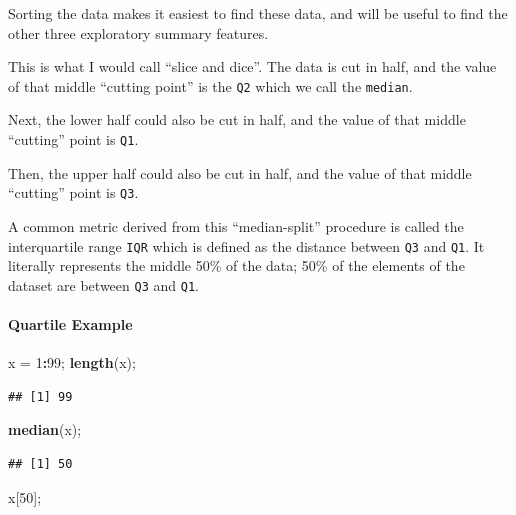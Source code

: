 \documentclass[
]{article}
\newenvironment{Shaded}{\begin{snugshade}}{\end{snugshade}}
\newcommand{\DecValTok}[1]{\textcolor[rgb]{0.00,0.00,0.81}{#1}}
\newcommand{\KeywordTok}[1]{\textcolor[rgb]{0.13,0.29,0.53}{\textbf{#1}}}
\newcommand{\NormalTok}[1]{#1}
\newcommand{\OperatorTok}[1]{\textcolor[rgb]{0.81,0.36,0.00}{\textbf{#1}}}
\newcommand{\StringTok}[1]{\textcolor[rgb]{0.31,0.60,0.02}{#1}}
\begin{document}
Sorting the data makes it easiest to find these data, and will be useful
to find the other three exploratory summary features.

This is what I would call ``slice and dice''. The data is cut in half,
and the value of that middle ``cutting point'' is the \texttt{Q2} which
we call the \texttt{median}.

Next, the lower half could also be cut in half, and the value of that
middle ``cutting'' point is \texttt{Q1}.

Then, the upper half could also be cut in half, and the value of that
middle ``cutting'' point is \texttt{Q3}.

A common metric derived from this ``median-split'' procedure is called
the interquartile range \texttt{IQR} which is defined as the distance
between \texttt{Q3} and \texttt{Q1}. It literally represents the middle
50\% of the data; 50\% of the elements of the dataset are between
\texttt{Q3} and \texttt{Q1}.

\hypertarget{quartile-example}{%
\paragraph{Quartile Example}\label{quartile-example}}

\begin{Shaded}
\begin{Highlighting}[]
\NormalTok{x =}\StringTok{ }\DecValTok{1}\OperatorTok{:}\DecValTok{99}\NormalTok{;}
\KeywordTok{length}\NormalTok{(x);}
\end{Highlighting}
\end{Shaded}

\begin{verbatim}
## [1] 99
\end{verbatim}

\begin{Shaded}
\begin{Highlighting}[]
\KeywordTok{median}\NormalTok{(x);}
\end{Highlighting}
\end{Shaded}

\begin{verbatim}
## [1] 50
\end{verbatim}

\begin{Shaded}
\begin{Highlighting}[]
\NormalTok{x[}\DecValTok{50}\NormalTok{];}
\end{Highlighting}
\end{Shaded}
\end{document}
